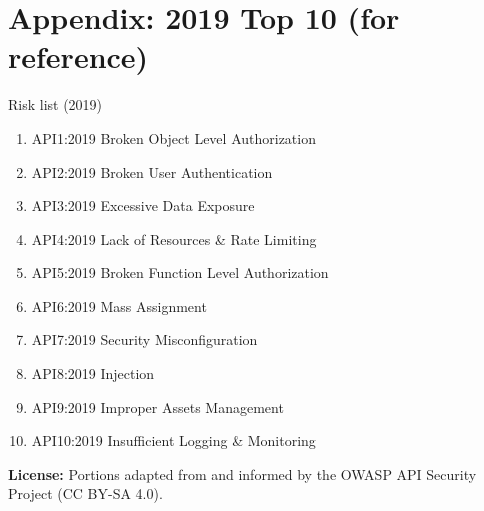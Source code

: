 \documentclass[11pt,a4paper]{article}
\begin{document}
\section*{Appendix: 2019 Top 10 (for reference)}
\begin{callout}{Risk list (2019)}
\begin{enumerate}
  \item API1:2019 Broken Object Level Authorization
  \item API2:2019 Broken User Authentication
  \item API3:2019 Excessive Data Exposure
  \item API4:2019 Lack of Resources \& Rate Limiting
  \item API5:2019 Broken Function Level Authorization
  \item API6:2019 Mass Assignment
  \item API7:2019 Security Misconfiguration
  \item API8:2019 Injection
  \item API9:2019 Improper Assets Management
  \item API10:2019 Insufficient Logging \& Monitoring
\end{enumerate}
\end{callout}

\vfill
\noindent\footnotesize \textbf{License:} Portions adapted from and informed by the OWASP API Security Project (CC BY-SA 4.0).\par
\end{document}
